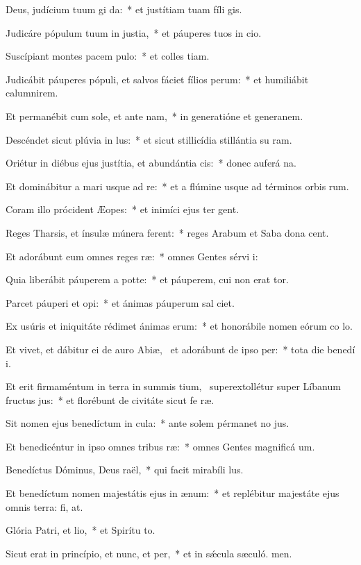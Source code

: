 \item Deus, judícium tuum gi da:~* et justítiam tuam fíli gis.
\item Judicáre pópulum tuum in justia,~* et páuperes tuos in cio.
\item Suscípiant montes pacem pulo:~* et colles tiam.
\item Judicábit páuperes pópuli, et salvos fáciet fílios perum:~* et humiliábit calumnirem.
\item Et permanébit cum sole, et ante nam,~* in generatióne et generanem.
\item Descéndet sicut plúvia in lus:~* et sicut stillicídia stillántia su ram.
\item Oriétur in diébus ejus justítia, et abundántia cis:~* donec auferá na.
\item Et dominábitur a mari usque ad re:~* et a flúmine usque ad términos orbis rum.
\item Coram illo prócident Æopes:~* et inimíci ejus ter gent.
\item Reges Tharsis, et ínsulæ múnera ferent:~* reges Arabum et Saba dona cent.
\item Et adorábunt eum omnes reges ræ:~* omnes Gentes sérvi i:
\item Quia liberábit páuperem a potte:~* et páuperem, cui non erat tor.
\item Parcet páuperi et opi:~* et ánimas páuperum sal ciet.
\item Ex usúris et iniquitáte rédimet ánimas erum:~* et honorábile nomen eórum co lo.
\item Et vivet, et dábitur ei de auro Abiæ,~\pscross{} et adorábunt de ipso per:~* tota die benedí i.
\item Et erit firmaméntum in terra in summis tium,~\pscross{} superextollétur super Líbanum fructus jus:~* et florébunt de civitáte sicut fe ræ.
\item Sit nomen ejus benedíctum in cula:~* ante solem pérmanet no jus.
\item Et benedicéntur in ipso omnes tribus ræ:~* omnes Gentes magnificá um.
\item Benedíctus Dóminus, Deus raël,~* qui facit mirabíli lus.
\item Et benedíctum nomen majestátis ejus in ænum:~* et replébitur majestáte ejus omnis terra: fi, at.
\item Glória Patri, et lio,~* et Spirítu to.
\item Sicut erat in princípio, et nunc, et per,~* et in sǽcula sæculó. men.
